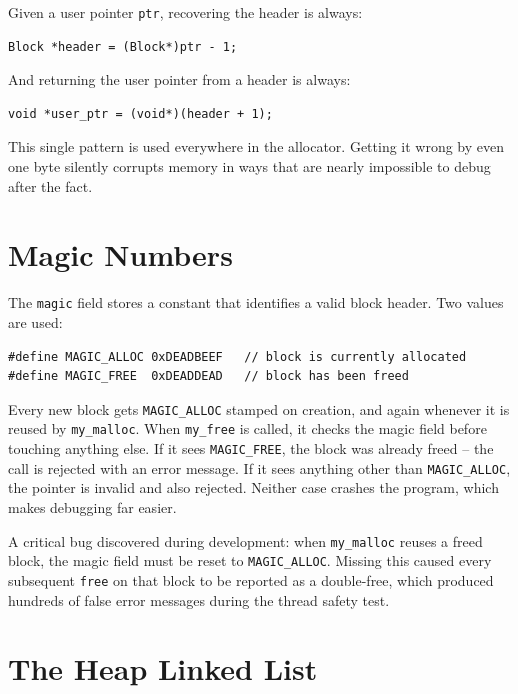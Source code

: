 \documentclass[12pt, a4paper]{report}
\begin{document}
Given a user pointer \texttt{ptr}, recovering the header is always:

\begin{lstlisting}
Block *header = (Block*)ptr - 1;
\end{lstlisting}

And returning the user pointer from a header is always:

\begin{lstlisting}
void *user_ptr = (void*)(header + 1);
\end{lstlisting}

This single pattern is used everywhere in the allocator. Getting it wrong by
even one byte silently corrupts memory in ways that are nearly impossible to
debug after the fact.

\section{Magic Numbers}

The \texttt{magic} field stores a constant that identifies a valid block header.
Two values are used:

\begin{lstlisting}
#define MAGIC_ALLOC 0xDEADBEEF   // block is currently allocated
#define MAGIC_FREE  0xDEADDEAD   // block has been freed
\end{lstlisting}

Every new block gets \texttt{MAGIC\_ALLOC} stamped on creation, and again
whenever it is reused by \texttt{my\_malloc}. When \texttt{my\_free} is called,
it checks the magic field before touching anything else. If it sees
\texttt{MAGIC\_FREE}, the block was already freed -- the call is rejected with
an error message. If it sees anything other than \texttt{MAGIC\_ALLOC}, the
pointer is invalid and also rejected. Neither case crashes the program, which
makes debugging far easier.

\begin{notebox}
A critical bug discovered during development: when \texttt{my\_malloc} reuses a
freed block, the magic field must be reset to \texttt{MAGIC\_ALLOC}. Missing
this caused every subsequent \texttt{free} on that block to be reported as a
double-free, which produced hundreds of false error messages during the thread
safety test.
\end{notebox}

\section{The Heap Linked List}
\end{document}

